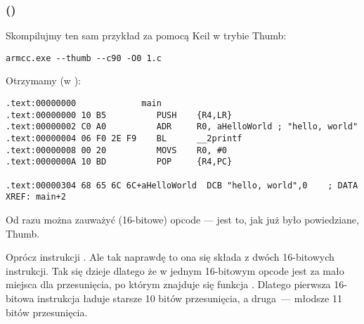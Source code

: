 \subsubsection{\NonOptimizingKeilVI (\ThumbMode)}

Skompilujmy ten sam przykład za pomocą Keil w trybie
 Thumb:

\begin{lstlisting}
armcc.exe --thumb --c90 -O0 1.c 
\end{lstlisting}

Otrzymamy (w \IDA):

\begin{lstlisting}[caption=\NonOptimizingKeilVI (\ThumbMode) + \IDA,style=customasmARM]
.text:00000000             main
.text:00000000 10 B5          PUSH    {R4,LR}
.text:00000002 C0 A0          ADR     R0, aHelloWorld ; "hello, world"
.text:00000004 06 F0 2E F9    BL      __2printf
.text:00000008 00 20          MOVS    R0, #0
.text:0000000A 10 BD          POP     {R4,PC}

.text:00000304 68 65 6C 6C+aHelloWorld  DCB "hello, world",0    ; DATA XREF: main+2
\end{lstlisting}

Od razu można zauważyć (16-bitowe) opcode --- jest to, jak już było powiedziane, Thumb.

Oprócz instrukcji .
Ale tak naprawdę to ona się składa z dwóch 16-bitowych instrukcji.
Tak się dzieje dlatego że w jednym 16-bitowym opcode jest za mało miejsca dla przesunięcia, po którym znajduje się funkcja \printf.
Dlatego pierwsza 16-bitowa instrukcja ładuje starsze 10 bitów przesunięcia, a druga~--- młodsze 11 bitów przesunięcia.


